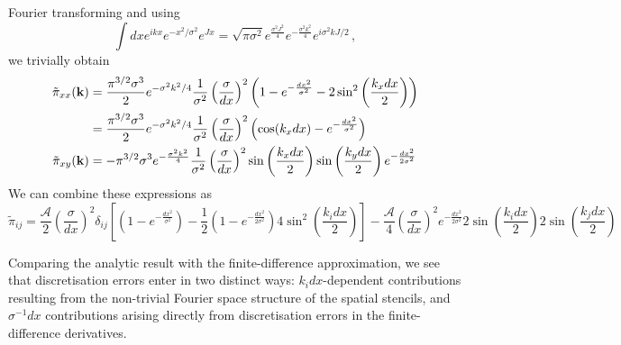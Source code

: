 \documentclass{revtex4}
\begin{document}
Fourier transforming and using
\begin{equation}
  \int dx e^{ikx}e^{-x^2/\sigma^2}e^{Jx} = \sqrt{\pi\sigma^2}e^{\frac{\sigma^2 J^2}{4}}e^{-\frac{\sigma^2 k^2}{4}}e^{i\sigma^2kJ/2} \, ,
\end{equation}
we trivially obtain
\begin{subequations}
\begin{align}
  \tilde{\pi}_{xx}({\bf k}) &= \frac{\pi^{3/2}\sigma^3}{2}e^{-\sigma^2 k^2/4}\frac{1}{\sigma^2}\left(\frac{\sigma}{dx}\right)^2\left(1-e^{-\frac{dx^2}{\sigma^2}} - 2\sin^2\left(\frac{k_xdx}{2}\right)\right) \\
  &= \frac{\pi^{3/2}\sigma^3}{2}e^{-\sigma^2 k^2/4}\frac{1}{\sigma^2}\left(\frac{\sigma}{dx}\right)^2\left(\cos(k_xdx) - e^{-\frac{dx^2}{\sigma^2}}\right) \\
  \tilde{\pi}_{xy}({\bf k}) &= -\pi^{3/2}\sigma^3e^{-\frac{\sigma^2k^2}{4}}\frac{1}{\sigma^2}\left(\frac{\sigma}{dx}\right)^2\sin\left(\frac{k_xdx}{2}\right)\sin\left(\frac{k_ydx}{2}\right)e^{-\frac{dx^2}{2\sigma^2}}
\end{align}
\end{subequations}
We can combine these expressions as
\begin{equation}
  \tilde{\pi}_{ij} = \frac{\mathcal{A}}{2}\left(\frac{\sigma}{dx}\right)^2\delta_{ij}\left[\left(1-e^{-\frac{dx^2}{\sigma^2}}\right) - \frac{1}{2}\left(1-e^{-\frac{dx^2}{2\sigma^2}}\right)4\sin^2\left(\frac{k_idx}{2}\right)\right] - \frac{\mathcal{A}}{4}\left(\frac{\sigma}{dx}\right)^2e^{-\frac{dx^2}{2\sigma^2}}2\sin\left(\frac{k_idx}{2}\right)2\sin\left(\frac{k_jdx}{2}\right)
\end{equation}

Comparing the analytic result with the finite-difference approximation, we see that discretisation errors enter in two distinct ways: $k_idx$-dependent contributions resulting from the non-trivial Fourier space structure of the spatial stencils, and $\sigma^{-1}dx$ contributions arising directly from discretisation errors in the finite-difference derivatives.
\end{document}
